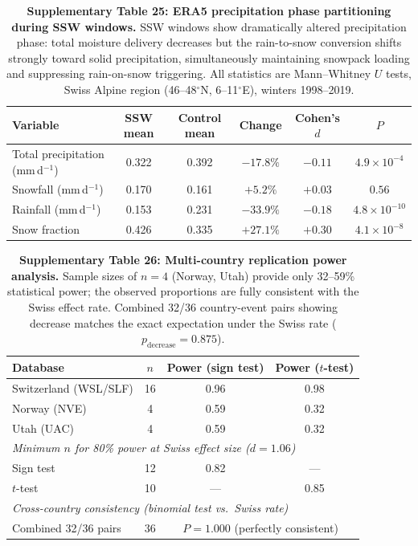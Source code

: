 \documentclass[11pt,letterpaper]{article}
\begin{document}
\begin{table}[!ht]
\centering
\caption{\textbf{Supplementary Table 25: ERA5 precipitation phase partitioning during SSW windows.}
SSW windows show dramatically altered precipitation phase: total moisture delivery decreases but the rain-to-snow conversion shifts strongly toward solid precipitation, simultaneously maintaining snowpack loading and suppressing rain-on-snow triggering. All statistics are Mann--Whitney $U$ tests, Swiss Alpine region (46--48$^\circ$N, 6--11$^\circ$E), winters 1998--2019.}
\label{tab:precip_phase}
\small
\begin{tabular}{lccccc}
\toprule
Variable & SSW mean & Control mean & Change & Cohen's $d$ & $P$ \\
\midrule
Total precipitation (mm\,d$^{-1}$) & 0.322 & 0.392 & $-17.8\%$ & $-0.11$ & $4.9 \times 10^{-4}$ \\
Snowfall (mm\,d$^{-1}$) & 0.170 & 0.161 & $+5.2\%$ & $+0.03$ & $0.56$ \\
Rainfall (mm\,d$^{-1}$) & 0.153 & 0.231 & $-33.9\%$ & $-0.18$ & $4.8 \times 10^{-10}$ \\
Snow fraction & 0.426 & 0.335 & $+27.1\%$ & $+0.30$ & $4.1 \times 10^{-8}$ \\
\bottomrule
\end{tabular}
\end{table}

\begin{table}[!ht]
\centering
\caption{\textbf{Supplementary Table 26: Multi-country replication power analysis.}
Sample sizes of $n = 4$ (Norway, Utah) provide only 32--59\% statistical power; the observed proportions are fully consistent with the Swiss effect rate. Combined 32/36 country-event pairs showing decrease matches the exact expectation under the Swiss rate ($p_{\mathrm{decrease}} = 0.875$).}
\label{tab:power}
\small
\begin{tabular}{lccc}
\toprule
Database & $n$ & Power (sign test) & Power ($t$-test) \\
\midrule
Switzerland (WSL/SLF) & 16 & 0.96 & 0.98 \\
Norway (NVE) & 4 & 0.59 & 0.32 \\
Utah (UAC) & 4 & 0.59 & 0.32 \\
\midrule
\multicolumn{4}{l}{\textit{Minimum $n$ for 80\% power at Swiss effect size ($d = 1.06$)}} \\
Sign test & 12 & 0.82 & --- \\
$t$-test & 10 & --- & 0.85 \\
\midrule
\multicolumn{4}{l}{\textit{Cross-country consistency (binomial test vs.\ Swiss rate)}} \\
Combined 32/36 pairs & 36 & \multicolumn{2}{c}{$P = 1.000$ (perfectly consistent)} \\
\bottomrule
\end{tabular}
\end{table}
\end{document}
